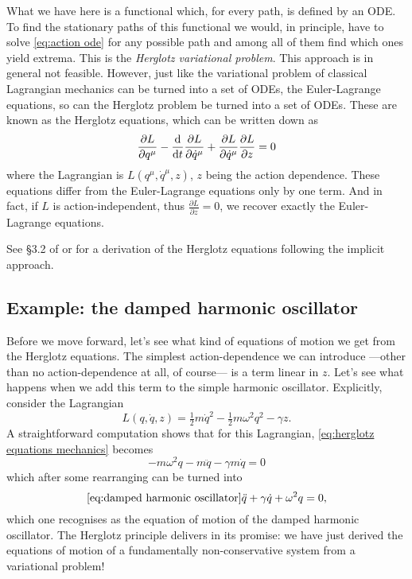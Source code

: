 \documentclass[../main.tex]{subfiles}
\begin{document}
What we have here is a functional which, for every path, is defined by an ODE. To find the
stationary paths of this functional we would, in principle, have to solve
\cref{eq:action ode} for any possible path and among all of them find which ones yield
extrema. This is the \emph{Herglotz variational problem}. This approach is in general not
feasible. However, just like the variational problem of classical Lagrangian mechanics can
be turned into a set of ODEs, the Euler-Lagrange equations, so can the Herglotz problem be
turned into a set of ODEs. These are known as the Herglotz equations, which can be written
down as
\begin{equation}\label{eq:herglotz equations mechanics}
	\frac{\partial L}{\partial q^\mu} - \frac{\mathrm{d}}{\mathrm{d} t}\frac{\partial L}{\partial \dot{q}^\mu}
	+\frac{\partial L}{\partial \dot{q}^\mu} \frac{\partial L}{\partial z} = 0
\end{equation}
where the Lagrangian is \( L(q^\mu, \dot{q}^\mu, z) \), \( z \) being the action
dependence. These equations differ from the Euler-Lagrange equations only by one term. And
in fact, if \( L \) is action-independent, thus \( \frac{\partial L}{\partial z} = 0 \),
we recover exactly the Euler-Lagrange equations. 

See \cite{Lazo2018} \S 3.2 of \cite{Leon2021} or for a derivation of the Herglotz
equations following the implicit approach. 

\subsection{Example: the damped harmonic oscillator}
Before we move forward, let's see what kind of equations of motion we get from the
Herglotz equations. The simplest action-dependence we can introduce ---other than no
action-dependence at all, of course--- is a term linear in \( z \). Let's see what happens
when we add this term to the simple harmonic oscillator. Explicitly, consider the
Lagrangian
\begin{equation*}
	L(q, \dot{q}, z) = \tfrac{1}{2}m\dot{q}^2 - \tfrac{1}{2} m\omega^2 q^2 - \gamma z. 
\end{equation*}
A straightforward computation shows that for this Lagrangian, \cref{eq:herglotz equations
mechanics} becomes
\begin{equation*}
	-m\omega^2 q - m\ddot{q} - \gamma m \dot{q} = 0
\end{equation*}
which after some rearranging can be turned into
\begin{equation}\cref{eq:damped harmonic oscillator}
	\ddot{q} + \gamma\dot{q} + \omega^2 q = 0,
\end{equation}
which one recognises as the equation of motion of the damped harmonic oscillator. The
Herglotz principle delivers in its promise: we have just derived the equations of motion
of a fundamentally non-conservative system from a variational problem!
\end{document}

